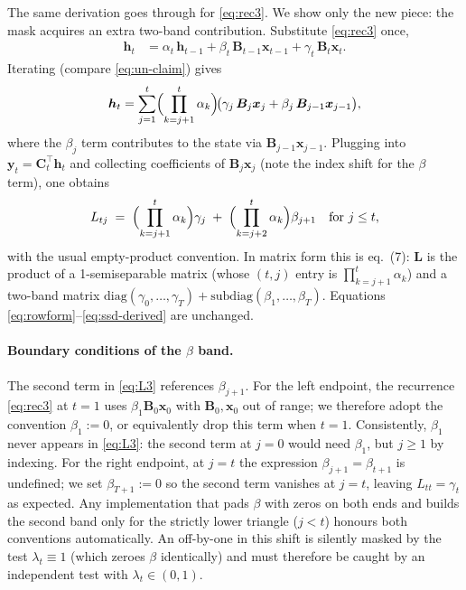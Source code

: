 \documentclass[11pt,a4paper]{article}
\begin{document}
The same derivation goes through for \eqref{eq:rec3}. We show only
the new piece: the mask acquires an extra two-band contribution.
Substitute \eqref{eq:rec3} once,
\begin{align}
  \bm{h}_t
   &= \alpha_t\,\bm{h}_{t-1}
     + \beta_t\,\bm{B}_{t-1}\bm{x}_{t-1}
     + \gamma_t\,\bm{B}_t\bm{x}_t.
\end{align}
Iterating (compare \eqref{eq:un-claim}) gives
\begin{equation}\label{eq:un3}
  \bm{h}_t = \sum_{j=1}^{t}
     \Bigl(\prod_{k=j+1}^{t}\alpha_k\Bigr)\!\bigl(\gamma_j\,\bm{B}_j\bm{x}_j
                                               + \beta_j\,\bm{B}_{j-1}\bm{x}_{j-1}\bigr),
\end{equation}
where the $\beta_j$ term contributes to the state via
$\bm{B}_{j-1}\bm{x}_{j-1}$. Plugging into
$\bm{y}_t = \bm{C}_t^\top\bm{h}_t$ and collecting coefficients of
$\bm{B}_j\bm{x}_j$ (note the index shift for the $\beta$ term), one
obtains
\begin{equation}\label{eq:L3}
  L_{tj} \;=\; \Bigl(\prod_{k=j+1}^{t}\alpha_k\Bigr)\gamma_j
            \;+\; \Bigl(\prod_{k=j+2}^{t}\alpha_k\Bigr)\beta_{j+1}
            \quad \text{for } j\le t,
\end{equation}
with the usual empty-product convention. In matrix form this is
\cite{mamba3} eq.~(7): $\bm{L}$ is the product of a
1-semiseparable matrix (whose $(t,j)$ entry is
$\prod_{k=j+1}^{t}\alpha_k$) and a two-band matrix
$\mathrm{diag}(\gamma_0,\dots,\gamma_T) + \mathrm{subdiag}(\beta_1,\dots,\beta_T)$.
Equations \eqref{eq:rowform}–\eqref{eq:ssd-derived} are unchanged.

\paragraph{Boundary conditions of the $\beta$ band.} The second term in
\eqref{eq:L3} references $\beta_{j+1}$. For the left endpoint, the
recurrence \eqref{eq:rec3} at $t=1$ uses $\beta_1 \bm{B}_0\bm{x}_0$
with $\bm{B}_0, \bm{x}_0$ out of range; we therefore adopt the
convention $\beta_1 := 0$, or equivalently drop this term when
$t=1$. Consistently, $\beta_1$ never appears in \eqref{eq:L3}: the
second term at $j=0$ would need $\beta_1$, but $j\ge 1$ by indexing.
For the right endpoint, at $j=t$ the expression $\beta_{j+1}=\beta_{t+1}$
is undefined; we set $\beta_{T+1} := 0$ so the second term vanishes
at $j=t$, leaving $L_{tt} = \gamma_t$ as expected. Any implementation
that pads $\beta$ with zeros on both ends and builds the second band
only for the strictly lower triangle ($j<t$) honours both conventions
automatically. An off-by-one in this shift is silently masked by the
test $\lambda_t\equiv 1$ (which zeroes $\beta$ identically) and must
therefore be caught by an independent test with $\lambda_t \in (0,1)$.
\end{document}

